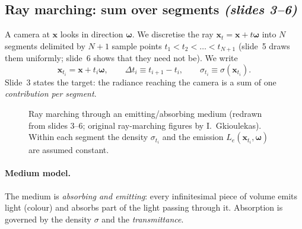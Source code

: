 \documentclass[11pt,a4paper]{article}
\newcommand{\xx}{\boldsymbol{x}}
\newcommand{\om}{\boldsymbol{\omega}}
\newcommand{\Le}{L_e}
\newcommand{\sref}[1]{\texorpdfstring{\emph{(slides #1)}}{(slides #1)}}
\theoremstyle{definition}
\theoremstyle{plain}
\begin{document}
\subsection{Ray marching: sum over segments \sref{3--6}}

A camera at $\xx$ looks in direction $\om$. We discretise the ray $\xx_t=\xx+t\om$ into $N$ segments delimited by $N+1$ sample points $t_1<t_2<\dots<t_{N+1}$ (slide~5 draws them uniformly; slide~6 shows that they need not be). We write
\[
\xx_{t_i}=\xx+t_i\om,\qquad \Delta t_i\equiv t_{i+1}-t_i,\qquad \sigma_{t_i}\equiv\sigma(\xx_{t_i}).
\]
Slide~3 states the target: the radiance reaching the camera is a sum of one \emph{contribution per segment}.

\begin{figure}[H]
\centering
{}
\caption{Ray marching through an emitting/absorbing medium (redrawn from slides 3--6; original ray-marching figures by I.\ Gkioulekas). Within each segment the density $\sigma_{t_i}$ and the emission $\Le(\xx_{t_i},\om)$ are assumed constant.}
\end{figure}

\paragraph{Medium model.} The medium is \emph{absorbing and emitting}: every infinitesimal piece of volume emits light (colour) and absorbs part of the light passing through it. Absorption is governed by the density $\sigma$ and the \emph{transmittance}.
\end{document}
